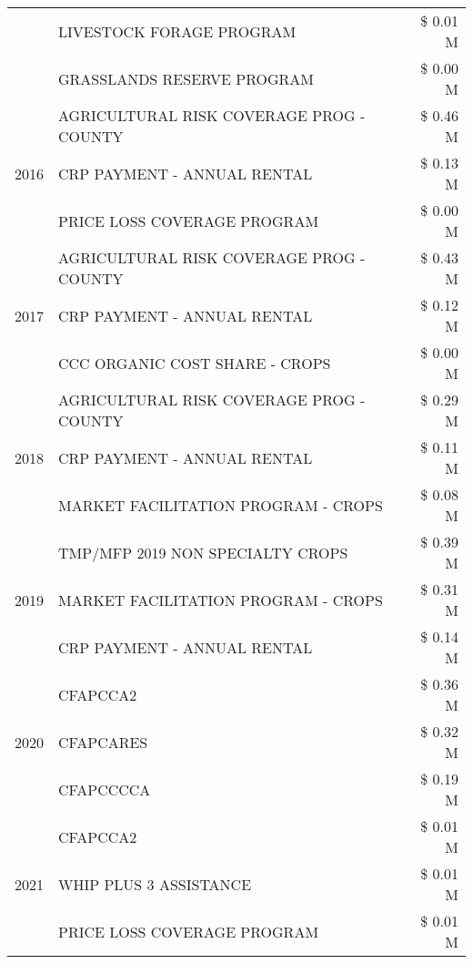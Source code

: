 \begin{tabular}{llr}
 & LIVESTOCK FORAGE PROGRAM & \$ 0.01 M \\
 & GRASSLANDS RESERVE PROGRAM & \$ 0.00 M \\
\cline{1-3}
\multirow[t]{3}{*}{2016} & AGRICULTURAL RISK COVERAGE PROG - COUNTY      & \$ 0.46 M \\
 & CRP PAYMENT - ANNUAL RENTAL                   & \$ 0.13 M \\
 & PRICE LOSS COVERAGE PROGRAM                   & \$ 0.00 M \\
\cline{1-3}
\multirow[t]{3}{*}{2017} & AGRICULTURAL RISK COVERAGE PROG - COUNTY & \$ 0.43 M \\
 & CRP PAYMENT - ANNUAL RENTAL & \$ 0.12 M \\
 & CCC ORGANIC COST SHARE - CROPS & \$ 0.00 M \\
\cline{1-3}
\multirow[t]{3}{*}{2018} & AGRICULTURAL RISK COVERAGE PROG - COUNTY & \$ 0.29 M \\
 & CRP PAYMENT - ANNUAL RENTAL & \$ 0.11 M \\
 & MARKET FACILITATION PROGRAM - CROPS & \$ 0.08 M \\
\cline{1-3}
\multirow[t]{3}{*}{2019} & TMP/MFP 2019 NON SPECIALTY CROPS & \$ 0.39 M \\
 & MARKET FACILITATION PROGRAM - CROPS & \$ 0.31 M \\
 & CRP PAYMENT - ANNUAL RENTAL & \$ 0.14 M \\
\cline{1-3}
\multirow[t]{3}{*}{2020} & CFAPCCA2 & \$ 0.36 M \\
 & CFAPCARES & \$ 0.32 M \\
 & CFAPCCCCA & \$ 0.19 M \\
\cline{1-3}
\multirow[t]{3}{*}{2021} & CFAPCCA2 & \$ 0.01 M \\
 & WHIP PLUS 3 ASSISTANCE & \$ 0.01 M \\
 & PRICE LOSS COVERAGE PROGRAM & \$ 0.01 M \\
\cline{1-3}
\bottomrule
\end{tabular}
